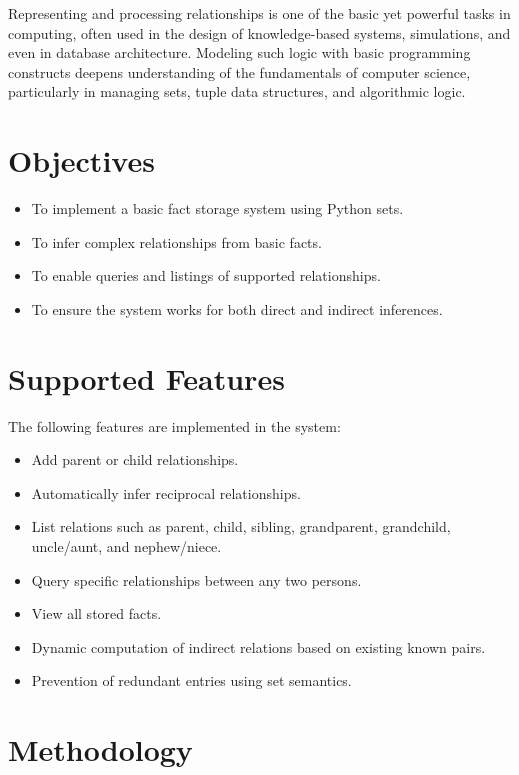 \documentclass[a4paper, journal]{IEEEtran}
\begin{document}
Representing and processing relationships is one of the basic yet powerful tasks in computing, often used in the design of knowledge-based systems, simulations, and even in database architecture. Modeling such logic with basic programming constructs deepens understanding of the fundamentals of computer science, particularly in managing sets, tuple data structures, and algorithmic logic.

\section{Objectives}

\begin{itemize}
    \item To implement a basic fact storage system using Python sets.
    \item To infer complex relationships from basic facts.
    \item To enable queries and listings of supported relationships.
    \item To ensure the system works for both direct and indirect inferences.

\end{itemize}

\section{Supported Features}

The following features are implemented in the system:
\begin{itemize}
    \item Add parent or child relationships.
    \item Automatically infer reciprocal relationships.
    \item List relations such as parent, child, sibling, grandparent, grandchild, uncle/aunt, and nephew/niece.
    \item Query specific relationships between any two persons.
    \item View all stored facts.
    \item Dynamic computation of indirect relations based on existing known pairs.
    \item Prevention of redundant entries using set semantics.
\end{itemize}

\section{Methodology}
\end{document}
